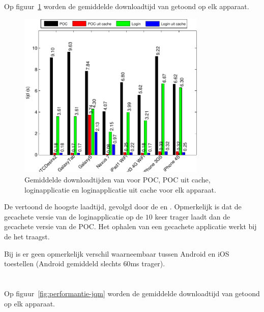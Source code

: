 
\section{\kendo}
\label{app:performantie-kendo}
Op figuur~\ref{fig:performantie-kendo} worden de gemiddelde downloadtijd van \kendo{} getoond op elk apparaat.

\begin{figure}
  \centering
  \includegraphics[width=0.8\textwidth]{figuren/performance-kendo.pdf}
  \caption{Gemiddelde downloadtijden van \kendo{} voor POC,  POC uit cache,  loginapplicatie en loginapplicatie uit cache voor elk apparaat.}
  \label{fig:performantie-kendo}
\end{figure}

De \gtab{} vertoond de hoogste laadtijd,  gevolgd door de \iphoneiii{} en \htc.
Opmerkelijk is dat de gecachete versie van de loginapplicatie op de \nexus{} $10$ keer trager laadt dan de gecachete versie van de POC.
Het ophalen van een gecachete applicatie werkt bij de \gs{} het traagst.

Bij \kendo{} is er geen opmerkelijk verschil waarneembaar tussen Android en iOS toestellen (Android gemiddeld slechts $60$ms trager).


\section{\jqm}
\label{app:performantie-jqm}
Op figuur~\ref{fig:performantie-jqm} worden de gemiddelde downloadtijd van \jqm{} getoond op elk apparaat.

